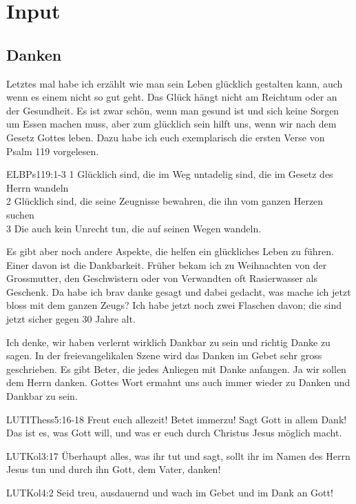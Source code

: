 \documentclass{../inc/mybib}
\begin{document}
\section{ Input }
\begin{spacing}{1.5}
\subsection{Danken}
Letztes mal habe ich erzählt wie man sein Leben glücklich gestalten kann, auch wenn es einem nicht so gut geht. Das Glück hängt nicht am Reichtum oder an der Gesundheit. Es ist zwar schön, wenn man gesund ist und sich keine Sorgen um Essen machen muss, aber zum glücklich sein hilft uns, wenn wir nach dem Gesetz Gottes leben. Dazu habe ich euch exemplarisch die ersten Verse von Psalm 119 vorgelesen.
\begin{bibelbox}{ELB}{Ps}{119:1-3}
1 Glücklich sind, die im Weg untadelig sind, die im Gesetz des Herrn wandeln\\
2 Glücklich sind, die seine Zeugnisse bewahren, die ihn vom ganzen Herzen suchen\\
3 Die auch kein Unrecht tun, die auf seinen Wegen wandeln.
\end{bibelbox}
Es gibt aber noch andere Aspekte, die helfen ein glückliches Leben zu führen. Einer davon ist die Dankbarkeit. Früher bekam ich zu Weihnachten von der Grossmutter, den Geschwistern oder von Verwandten oft Rasierwasser als Geschenk. Da habe ich brav danke gesagt und dabei gedacht, was mache ich jetzt bloss mit dem ganzen Zeugs? Ich habe jetzt noch zwei Flaschen davon; die sind jetzt sicher gegen 30 Jahre alt.

Ich denke, wir haben verlernt wirklich Dankbar zu sein und richtig Danke zu sagen. In der freievangelikalen Szene wird das Danken im Gebet sehr gross geschrieben. Es gibt Beter, die jedes Anliegen mit Danke anfangen. Ja wir sollen dem Herrn danken. Gottes Wort ermahnt uns auch immer wieder zu Danken und Dankbar zu sein.
\begin{bibelbox}{LUT}{IThess}{5:16-18}
Freut euch allezeit! Betet immerzu! Sagt Gott in allem Dank! Das ist es, was Gott will, und was er euch durch Christus Jesus möglich macht.
\end{bibelbox}
\begin{bibelbox}{LUT}{Kol}{3:17}
Überhaupt alles, was ihr tut und sagt, sollt ihr im Namen des Herrn Jesus tun und durch ihn Gott, dem Vater, danken!
\end{bibelbox}
\begin{bibelbox}{LUT}{Kol}{4:2}
Seid treu, ausdauernd und wach im Gebet und im Dank an Gott!
\end{bibelbox}


\end{spacing}
\end{document}
